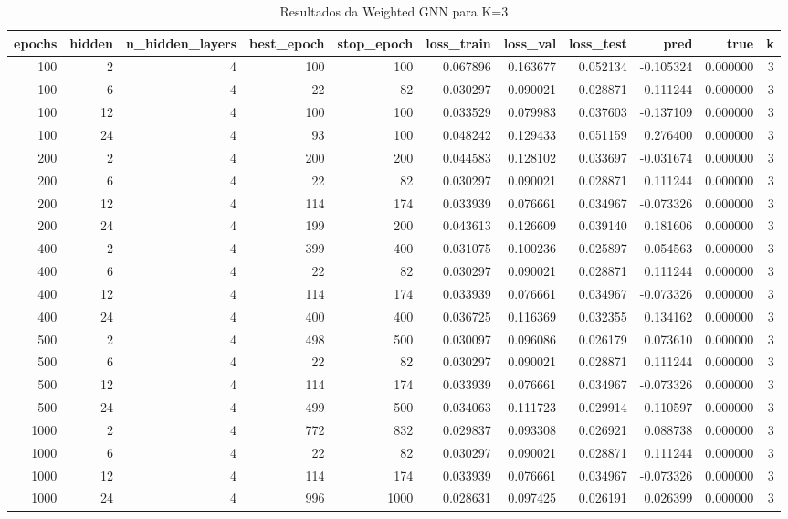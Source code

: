 \begin{table}
\caption{Resultados da Weighted GNN para K=3}
\label{tab:weighted_gnn_results_k3}
\begin{tabular}{rrrrrrrrrrr}
\toprule
epochs & hidden & n\_hidden\_layers & best\_epoch & stop\_epoch & loss\_train & loss\_val & loss\_test & pred & true & k \\
\midrule
100 & 2 & 4 & 100 & 100 & 0.067896 & 0.163677 & 0.052134 & -0.105324 & 0.000000 & 3 \\
100 & 6 & 4 & 22 & 82 & 0.030297 & 0.090021 & 0.028871 & 0.111244 & 0.000000 & 3 \\
100 & 12 & 4 & 100 & 100 & 0.033529 & 0.079983 & 0.037603 & -0.137109 & 0.000000 & 3 \\
100 & 24 & 4 & 93 & 100 & 0.048242 & 0.129433 & 0.051159 & 0.276400 & 0.000000 & 3 \\
200 & 2 & 4 & 200 & 200 & 0.044583 & 0.128102 & 0.033697 & -0.031674 & 0.000000 & 3 \\
200 & 6 & 4 & 22 & 82 & 0.030297 & 0.090021 & 0.028871 & 0.111244 & 0.000000 & 3 \\
200 & 12 & 4 & 114 & 174 & 0.033939 & 0.076661 & 0.034967 & -0.073326 & 0.000000 & 3 \\
200 & 24 & 4 & 199 & 200 & 0.043613 & 0.126609 & 0.039140 & 0.181606 & 0.000000 & 3 \\
400 & 2 & 4 & 399 & 400 & 0.031075 & 0.100236 & 0.025897 & 0.054563 & 0.000000 & 3 \\
400 & 6 & 4 & 22 & 82 & 0.030297 & 0.090021 & 0.028871 & 0.111244 & 0.000000 & 3 \\
400 & 12 & 4 & 114 & 174 & 0.033939 & 0.076661 & 0.034967 & -0.073326 & 0.000000 & 3 \\
400 & 24 & 4 & 400 & 400 & 0.036725 & 0.116369 & 0.032355 & 0.134162 & 0.000000 & 3 \\
500 & 2 & 4 & 498 & 500 & 0.030097 & 0.096086 & 0.026179 & 0.073610 & 0.000000 & 3 \\
500 & 6 & 4 & 22 & 82 & 0.030297 & 0.090021 & 0.028871 & 0.111244 & 0.000000 & 3 \\
500 & 12 & 4 & 114 & 174 & 0.033939 & 0.076661 & 0.034967 & -0.073326 & 0.000000 & 3 \\
500 & 24 & 4 & 499 & 500 & 0.034063 & 0.111723 & 0.029914 & 0.110597 & 0.000000 & 3 \\
1000 & 2 & 4 & 772 & 832 & 0.029837 & 0.093308 & 0.026921 & 0.088738 & 0.000000 & 3 \\
1000 & 6 & 4 & 22 & 82 & 0.030297 & 0.090021 & 0.028871 & 0.111244 & 0.000000 & 3 \\
1000 & 12 & 4 & 114 & 174 & 0.033939 & 0.076661 & 0.034967 & -0.073326 & 0.000000 & 3 \\
1000 & 24 & 4 & 996 & 1000 & 0.028631 & 0.097425 & 0.026191 & 0.026399 & 0.000000 & 3 \\
\bottomrule
\end{tabular}
\end{table}
